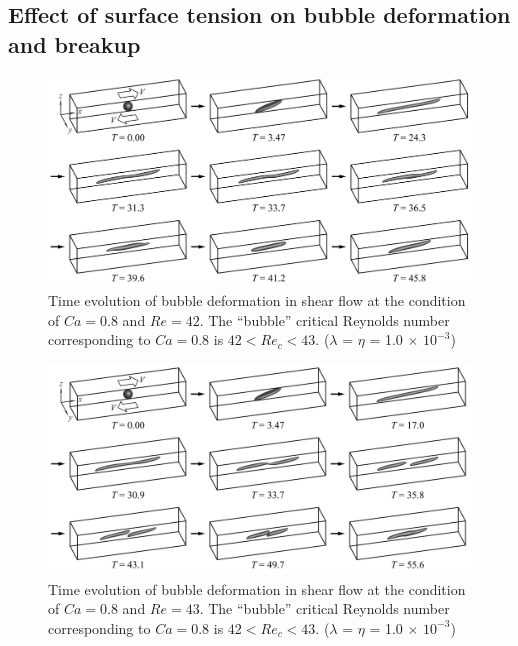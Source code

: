 \documentclass[%
 reprint,
 showkeys,
 amsmath,amssymb,
 aps,
 prfluids,
 onecolumn
]{revtex4-2}
\begin{document}
\subsection{Effect of surface tension on bubble deformation and breakup}
%
\begin{figure}%
  \centering
  \includegraphics[width=\textwidth]{BubbleDeformCa0p8Re42}
  \caption{Time evolution of bubble deformation in shear flow at the 
           condition of $Ca=0.8$ and $Re=42$.
	   The ``bubble'' 
	   critical Reynolds number corresponding to $Ca=0.8$ is
	   $42<Re_{c}<43$.
           ($\lambda$ = $\eta$ = 1.0 $\times$ $10^{-3}$) 
	   }
  \label{fig:BubDefCa0p8Re42}
\end{figure}
%
\begin{figure}%
  \centering
  \includegraphics[width=\textwidth]{BubbleBreakCa0p8Re43}
  \caption{Time evolution of bubble deformation in shear flow at the 
           condition of $Ca=0.8$ and $Re=43$.
	   The ``bubble'' 
	   critical Reynolds number corresponding to $Ca=0.8$ is
	   $42<Re_{c}<43$.
           ($\lambda$ = $\eta$ = 1.0 $\times$ $10^{-3}$) 
	   }
  \label{fig:BubBrkCa0p8Re43}
\end{figure}
%
\end{document}
